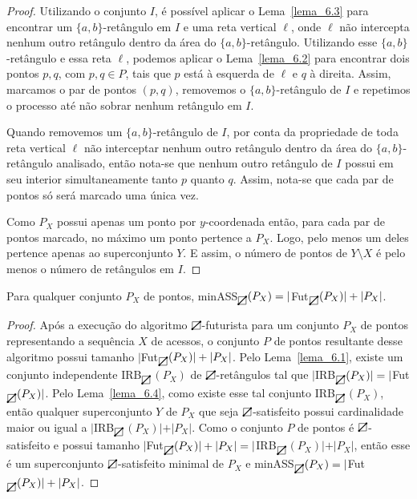 \begin{proof}
    Utilizando o conjunto $I$, é possível aplicar o Lema~\ref{lema_6.3} para encontrar um $\{a,b\}$-retângulo em $I$ e uma reta vertical $\ell$, onde $\ell$ não intercepta nenhum outro retângulo dentro da área do $\{a,b\}$-retângulo. Utilizando esse $\{a,b\}$-retângulo e essa reta $\ell$, podemos aplicar o Lema~\ref{lema_6.2} para encontrar dois pontos $p,q$, com $p,q \in P$, tais que $p$ está à esquerda de $\ell$ e $q$ à direita. Assim, marcamos o par de pontos $(p,q)$, removemos o $\{a,b\}$-retângulo de $I$ e repetimos o processo até não sobrar nenhum retângulo em $I$.

    Quando removemos um $\{a,b\}$-retângulo de $I$, por conta da propriedade de toda reta vertical $\ell$ não interceptar nenhum outro retângulo dentro da área do $\{a,b\}$-retângulo analisado, então nota-se que nenhum outro retângulo de $I$ possui em seu interior simultaneamente tanto $p$ quanto $q$. Assim, nota-se que cada par de pontos só será marcado uma única vez.

    Como $P_X$ possui apenas um ponto por $y$-coordenada então, para cada par de pontos marcado, no máximo um ponto pertence a $P_X$. Logo, pelo menos um deles pertence apenas ao superconjunto $Y$. E assim, o número de pontos de $Y \setminus X$ é pelo menos o número de retângulos em $I$. 
\end{proof}

\begin{lemma}\label{lema_minASS_para_Fut}
    Para qualquer conjunto $P_X$ de pontos, minASS$_{\rectpos}(P_X) = |$Fut$_{\rectpos}(P_X)| + |P_X|$.
\end{lemma}

\begin{proof}
    Após a execução do algoritmo $\rectpos$-futurista para um conjunto $P_X$ de pontos representando a sequência $X$ de acessos, o conjunto $P$ de pontos resultante desse algoritmo possui tamanho $|$Fut$_{\rectpos}(P_X)| + |P_X|$. Pelo Lema~\ref{lema_6.1}, existe um conjunto independente IRB$_{\rectpos}$$(P_X)$ de $\rectpos$-retângulos tal que $|$IRB$_{\rectpos}(P_X)| = |$Fut$_{\rectpos}(P_X)|$. Pelo Lema~\ref{lema_6.4}, como existe esse tal conjunto IRB$_{\rectpos}$$(P_X)$, então qualquer superconjunto $Y$ de $P_X$ que seja $\rectpos$-satisfeito possui cardinalidade maior ou igual a $|$IRB$_{\rectpos}$$(P_X)| + |P_X|$. Como o conjunto $P$ de pontos é $\rectpos$-satisfeito e possui tamanho $|$Fut$_{\rectpos}(P_X)| + |P_X| = |$IRB$_{\rectpos}$$(P_X)| + |P_X|$, então esse é um superconjunto $\rectpos$-satisfeito minimal de $P_X$ e minASS$_{\rectpos}(P_X) = |$Fut$_{\rectpos}(P_X)| + |P_X|$.
\end{proof}

